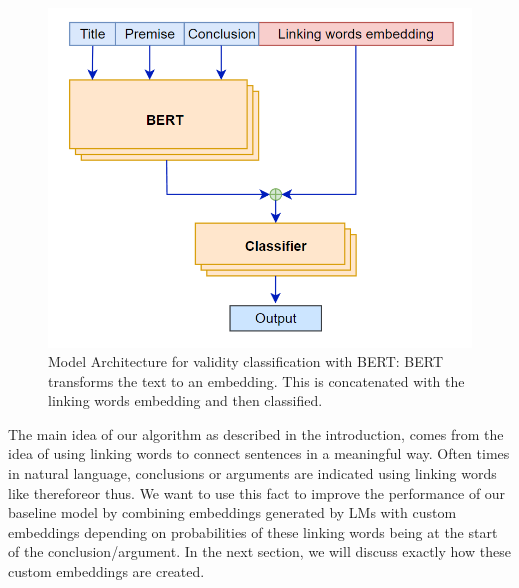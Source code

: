 \begin{figure}[h]
  \centering
  \includegraphics[scale=0.6]{fig/model_diag1.png}
  \caption{Model Architecture for validity classification with BERT: BERT transforms the text to an embedding. This is concatenated with the linking words embedding and then classified.}%
  \label{fig:model-architecture1}
\end{figure}

The main idea of our algorithm as described in the introduction, comes from the idea of using linking words to connect sentences in a meaningful way. Often times in natural language, conclusions or arguments are indicated using linking words like \dq therefore\dq or \dq thus\dq. We want to use this fact to improve the performance of our baseline model by combining embeddings generated by LMs with custom embeddings depending on probabilities of these linking words being at the start of the conclusion/argument. In the next section, we will discuss exactly how these custom embeddings are created.

